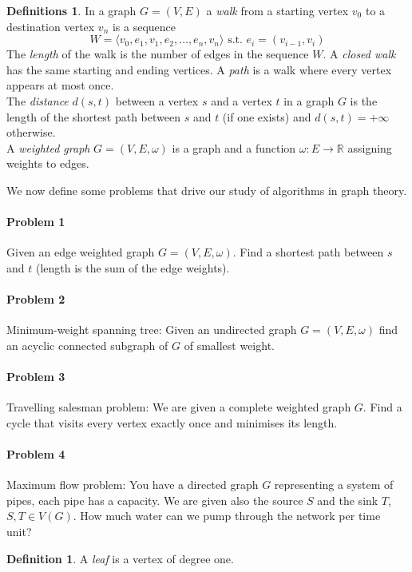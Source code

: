 \documentclass{article}
\theoremstyle{definition}
\newtheorem*{defn}{Definition}
\newtheorem*{defns}{Definitions}
\newcommand{\RR}{\mathbb{R}}
\begin{document}
\begin{defns}
In a graph $G= (V,E)$ a \emph{walk} from a starting vertex $v_0$ to a destination vertex $v_n$ is a sequence
$$W=\langle v_0,e_1,v_1,e_2,\ldots,e_n,v_n\rangle\text{ s.t. }e_i=(v_{i-1},v_i)$$
The \emph{length} of the walk is the number of edges in the sequence $W$.
A \emph{closed walk} has the same starting and ending vertices.
A \emph{path} is a walk where every vertex appears at most once.\\
The \emph{distance} $d(s,t)$ between a vertex $s$ and a vertex $t$ in a graph $G$ is the length of the shortest path between $s$ and $t$ (if one exists) and $d(s,t)=+\infty$ otherwise.\\
A \emph{weighted graph} $G= (V,E,\omega)$ is a graph and a function $\omega\colon E\to \RR$ assigning weights to edges.
\end{defns}

We now define some problems that drive our study of algorithms in graph theory.
\paragraph{Problem 1}
Given an edge weighted graph $G=(V,E,\omega)$.
Find a shortest path between $s$ and $t$ (length is the sum of the edge weights).

\paragraph{Problem 2}
Minimum-weight spanning tree:
Given an undirected graph $G=(V,E,\omega)$ find an acyclic connected subgraph of $G$ of smallest weight.

\paragraph{Problem 3}
Travelling salesman problem:
We are given a complete weighted graph $G$.
Find a cycle that visits every vertex exactly once and minimises its length.

\paragraph{Problem 4}
Maximum flow problem:
You have a directed graph $G$ representing a system of pipes, each pipe has a capacity.
We are given also the source $S$ and the sink $T$, $S,T\in V(G)$.
How much water can we pump through the network per time unit?

\begin{defn}
A \emph{leaf} is a vertex of degree one.
\end{defn}
\end{document}
